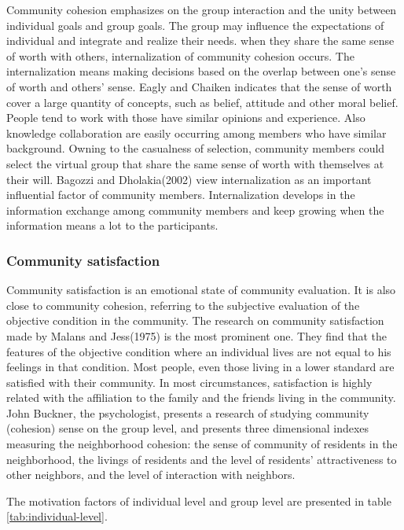 \documentclass{elsarticle}
\begin{document}
Community cohesion emphasizes on the group interaction and the
unity between individual goals and group goals. The group may influence
the expectations of individual and  integrate and realize their
needs. when they share the same sense of
worth with others, internalization of community cohesion occurs.
 The
internalization means making decisions based on the overlap between
one’s sense of worth and others’ sense. Eagly and Chaiken indicates that the
sense of worth cover a large quantity of concepts, such as belief,
attitude and other moral belief\cite{eagly1993pa}. People tend to work
with those have similar opinions and experience. Also knowledge
collaboration are easily occurring among members who have similar background.  Owning to the casualness of selection,
community members could select the virtual group that share
the same sense of worth with themselves at their will. Bagozzi and Dholakia(2002)
view internalization as an important influential factor of community
members\cite{richard_p._bagozzi_intentional_2002}. Internalization develops in the information exchange among
community members and keep growing when the information means a lot to
the participants. 

\subsubsection{Community satisfaction}
\label{sec:comm-satisf}

Community satisfaction is an emotional state of community
evaluation. It is also close to community cohesion, referring to the
subjective evaluation of the objective condition in the community. The
research on community satisfaction made by Malans and Jess(1975) is
the most prominent one. They find that the features of the objective
condition where an individual lives are not equal to his feelings in
that condition. Most people, even those living in a lower standard are
satisfied with their community. In most circumstances, satisfaction is
highly related with the affiliation to the family and the friends
living in the community\cite{marans1975tuc}. John Buckner, the psychologist, presents
a research of studying community (cohesion) sense on the group level,
and presents three dimensional indexes measuring the neighborhood
cohesion: the sense of community of residents in the neighborhood, the
livings of residents and the level of residents’ attractiveness to
other neighbors, and the level of interaction with
neighbors\cite{buckner1988dim}.

The motivation factors of  individual level and group level are presented in table \ref{tab:individual-level}.
\end{document}
